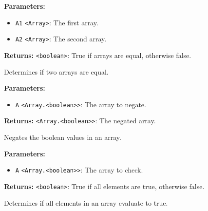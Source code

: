 \documentclass[12pt,a4paper]{article}
\begin{document}
\vspace{5mm}
\noindent {}


\noindent \textbf{Parameters:}
\begin{itemize}
  \item \texttt{A1} \texttt{<Array>}: The first array.
  \item \texttt{A2} \texttt{<Array>}: The second array.
\end{itemize}

\noindent \textbf{Returns:} \texttt{<boolean>}: True if arrays are equal, otherwise false.

\noindent Determines if two arrays are equal.

\vspace{5mm}
\noindent {}


\noindent \textbf{Parameters:}
\begin{itemize}
  \item \texttt{A} \texttt{<Array.<boolean>>}: The array to negate.
\end{itemize}

\noindent \textbf{Returns:} \texttt{<Array.<boolean>>}: The negated array.

\noindent Negates the boolean values in an array.

\vspace{5mm}
\noindent {}


\noindent \textbf{Parameters:}
\begin{itemize}
  \item \texttt{A} \texttt{<Array.<boolean>>}: The array to check.
\end{itemize}

\noindent \textbf{Returns:} \texttt{<boolean>}: True if all elements are true, otherwise false.

\noindent Determines if all elements in an array evaluate to true.

\vspace{5mm}
\noindent {}
\end{document}
